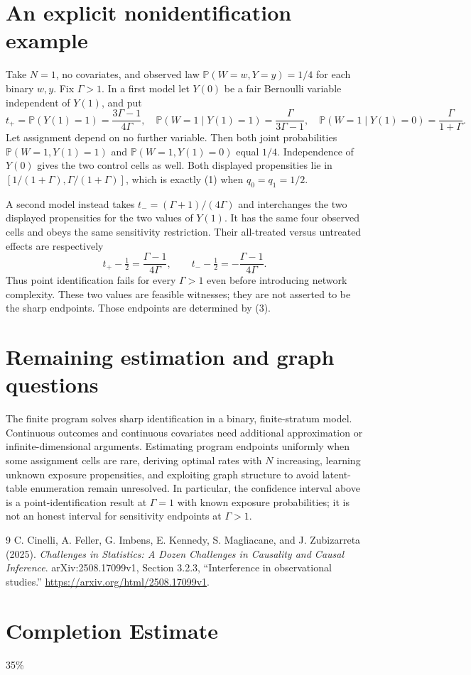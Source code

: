 \documentclass[11pt,a4paper]{article}
\theoremstyle{definition}
\theoremstyle{remark}
\newcommand{\Prb}{\mathbb P}
\begin{document}
\section{An explicit nonidentification example}
Take $N=1$, no covariates, and observed law
$\Prb(W=w,Y=y)=1/4$ for each binary $w,y$. Fix $\Gamma>1$. In a first model let $Y(0)$ be a fair Bernoulli variable independent of $Y(1)$, and put
\[
 t_+=\Prb(Y(1)=1)=\frac{3\Gamma-1}{4\Gamma},
\quad
 \Prb(W=1\mid Y(1)=1)=\frac\Gamma{3\Gamma-1},
\quad
 \Prb(W=1\mid Y(1)=0)=\frac\Gamma{1+\Gamma}.
\]
Let assignment depend on no further variable. Then both joint probabilities $\Prb(W=1,Y(1)=1)$ and $\Prb(W=1,Y(1)=0)$ equal $1/4$. Independence of $Y(0)$ gives the two control cells as well. Both displayed propensities lie in $[1/(1+\Gamma),\Gamma/(1+\Gamma)]$, which is exactly (1) when $q_0=q_1=1/2$.

A second model instead takes
$t_-=(\Gamma+1)/(4\Gamma)$ and interchanges the two displayed propensities for the two values of $Y(1)$. It has the same four observed cells and obeys the same sensitivity restriction. Their all-treated versus untreated effects are respectively
\[
 t_+-\tfrac12=\frac{\Gamma-1}{4\Gamma},
 \qquad
 t_--\tfrac12=-\frac{\Gamma-1}{4\Gamma}.
\]
Thus point identification fails for every $\Gamma>1$ even before introducing network complexity. These two values are feasible witnesses; they are not asserted to be the sharp endpoints. Those endpoints are determined by (3).

\section{Remaining estimation and graph questions}
The finite program solves sharp identification in a binary, finite-stratum model. Continuous outcomes and continuous covariates need additional approximation or infinite-dimensional arguments. Estimating program endpoints uniformly when some assignment cells are rare, deriving optimal rates with $N$ increasing, learning unknown exposure propensities, and exploiting graph structure to avoid latent-table enumeration remain unresolved. In particular, the confidence interval above is a point-identification result at $\Gamma=1$ with known exposure probabilities; it is not an honest interval for sensitivity endpoints at $\Gamma>1$.
\begin{thebibliography}{9}
 C. Cinelli, A. Feller, G. Imbens, E. Kennedy, S. Magliacane, and J. Zubizarreta (2025).
\emph{Challenges in Statistics: A Dozen Challenges in Causality and Causal Inference}. arXiv:2508.17099v1, Section 3.2.3, ``Interference in observational studies.''
\url{https://arxiv.org/html/2508.17099v1}.
\end{thebibliography}

\section{Completion Estimate}
35\%
\end{document}
